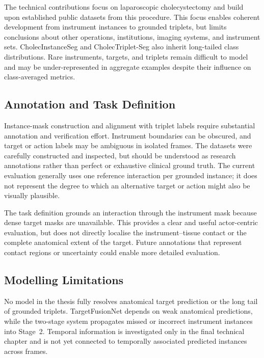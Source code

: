 The technical contributions focus on laparoscopic cholecystectomy and build upon established public datasets from this procedure. This focus enables coherent development from instrument instances to grounded triplets, but limits conclusions about other operations, institutions, imaging systems, and instrument sets. CholecInstanceSeg and CholecTriplet-Seg also inherit long-tailed class distributions. Rare instruments, targets, and triplets remain difficult to model and may be under-represented in aggregate examples despite their influence on class-averaged metrics.

\subsection{Annotation and Task Definition}
\label{sec:discussion-annotation-limitations}

Instance-mask construction and alignment with triplet labels require substantial annotation and verification effort. Instrument boundaries can be obscured, and target or action labels may be ambiguous in isolated frames. The datasets were carefully constructed and inspected, but should be understood as research annotations rather than perfect or exhaustive clinical ground truth. The current evaluation generally uses one reference interaction per grounded instance; it does not represent the degree to which an alternative target or action might also be visually plausible.

The task definition grounds an interaction through the instrument mask because dense target masks are unavailable. This provides a clear and useful actor-centric evaluation, but does not directly localise the instrument--tissue contact or the complete anatomical extent of the target. Future annotations that represent contact regions or uncertainty could enable more detailed evaluation.

\subsection{Modelling Limitations}
\label{sec:discussion-modelling-limitations}

No model in the thesis fully resolves anatomical target prediction or the long tail of grounded triplets. TargetFusionNet depends on weak anatomical predictions, while the two-stage system propagates missed or incorrect instrument instances into Stage~2. Temporal information is investigated only in the final technical chapter and is not yet connected to temporally associated predicted instances across frames.

